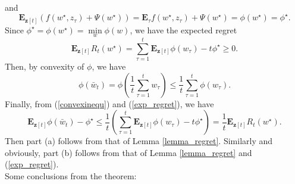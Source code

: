 and 
$$
\mathbf{E}_{\mathbf{z}[t]}\left( f(w^{\star},z_{\tau})+\Psi(w^{\star})\right)=
\mathbf{E}_{\tau} f(w^{\star},z_{\tau})+\Psi(w^{\star}) = \phi(w^{\star}) = \phi^{\star}.
$$
Since $\phi^{\star}=\phi(w^{\star})=\min\limits_w\phi(w)$, we have the expected regret
\begin{equation}\label{exp_regret}
	\mathbf{E}_{\mathbf{z}[t]} R_t(w^{\star})=\sum_{\tau=1}^{t} \mathbf{E}_{\mathbf{z}[t]} \phi(w_\tau)-t\phi^{\star}\geq 0.
\end{equation}
Then, by convexity of $\phi$, we have  
\begin{equation}\label{convexinequ}
	\phi(\bar{w}_t)=\phi\left(\frac{1}{t} \sum_{\tau=1}^{t} w_\tau  \right) \leq
	\frac{1}{t}\sum_{\tau=1}^{t}\phi\left( w_\tau  \right).
\end{equation}
Finally, from (\ref{convexinequ}) and (\ref{exp_regret}), we have
$$
\mathbf{E}_{\mathbf{z}[t]} \phi(\bar{w}_t)-\phi^{\star} \leq 
\frac{1}{t}\left(\sum_{\tau=1}^{t}	\mathbf{E}_{\mathbf{z}[t]}\phi( w_\tau)-t\phi^{\star}\right) =
\frac{1}{t}\mathbf{E}_{\mathbf{z}[t]} R_t(w^{\star}).
$$
Then part (a) follows from that of Lemma \ref{lemma_regret}. Similarly and obviously, part (b) follows from that of Lemma \ref{lemma_regret} and (\ref{exp_regret}).
\\
Some conclusions from the theorem:

